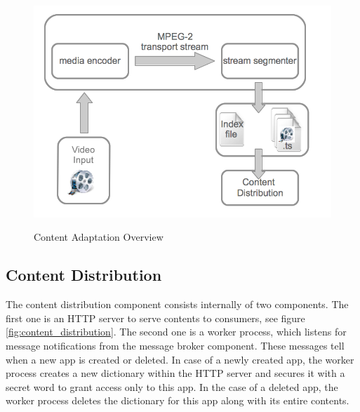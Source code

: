 
\begin{figure}[htb]
  \centering
  \includegraphics[scale=0.3]{img/content_adaptation_overview.png}\\
  \caption{Content Adaptation Overview}
  \label{fig:content_adaptation_overview}
\end{figure}

\pagebreak

\subsection{Content Distribution\label{sec:des_cdn}}
The content distribution component consists internally of two components. The first one is an \ac{HTTP} server to serve contents to consumers, see figure \ref{fig:content_distribution}. The second one is a worker process, which listens for message notifications from the message broker component. These messages tell when a new app is created or deleted. In case of a newly created app, the worker process creates a new dictionary within the \ac{HTTP} server and secures it with a secret word to grant access only to this app. In the case of a deleted app, the worker process deletes the dictionary for this app along with its entire contents.

